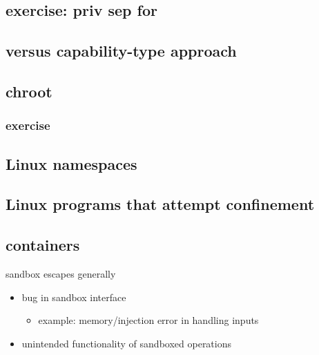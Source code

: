 \subsection{exercise: priv sep for}



\subsection{versus capability-type approach}


\subsection{chroot}


\subsubsection{exercise}


\subsection{Linux namespaces}




\subsection{Linux programs that attempt confinement}


\subsection{containers}


\begin{frame}{sandbox escapes generally}
    \begin{itemize}
    \item bug in sandbox interface
        \begin{itemize}
        \item example: memory/injection error in handling inputs
        \end{itemize}
    \item unintended functionality of sandboxed operations
    \end{itemize}
\end{frame}

